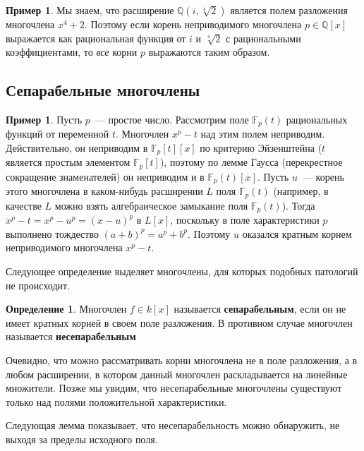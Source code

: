 \documentclass[a4paper,11pt]{scrartcl}
\theoremstyle{plain}
\theoremstyle{definition}
\newtheorem{definition}[theorem]{Определение}
\newtheorem{example}[theorem]{Пример}
\newcommand\dfn[1]{\textbf{#1}}
\newcommand\mb{\mathbb}
\begin{document}
\begin{example}
Мы знаем, что расширение $\mb Q(i,\sqrt[4]{2})$ является полем
разложения многочлена $x^4+2$. Поэтому
если корень неприводимого многочлена $p\in\mb Q[x]$ выражается как
рациональная функция от $i$ и $\sqrt[4]{2}$ с рациональными
коэффициентами, то \emph{все} корни $p$ выражаются таким образом.
\end{example}

\subsection{Сепарабельные многочлены}

\begin{example}
Пусть $p$~--- простое число. Рассмотрим поле $\mb F_p(t)$ рациональных
функций от переменной $t$. Многочлен $x^p-t$ над этим полем
неприводим. Действительно, он неприводим в $\mb F_p[t][x]$ по критерию
Эйзенштейна ($t$ является простым элементом $\mb F_p[t]$), поэтому по
лемме Гаусса (перекрестное сокращение знаменателей) он неприводим и в
$\mb F_p(t)[x]$. Пусть $u$~--- корень этого многочлена в каком-нибудь
расширении $L$ поля $\mb F_p(t)$ (например, в качестве $L$ можно взять
алгебраическое замыкание поля $\mb F_p(t)$). Тогда
$x^p-t=x^p-u^p=(x-u)^p$ в $L[x]$, поскольку в поле характеристики $p$
выполнено тождество $(a+b)^p=a^p+b^p$. Поэтому $u$ оказался кратным
корнем неприводимого многочлена $x^p-t$.
\end{example}

Следующее определение выделяет многочлены, для которых подобных
патологий не происходит.

\begin{definition}
Многочлен $f\in k[x]$ называется \dfn{сепарабельным}, если он не имеет
кратных корней в своем поле разложения. В противном случае многочлен
называется \dfn{несепарабельным}
\end{definition}
Очевидно, что можно рассматривать корни многочлена не в поле
разложения, а в любом расширении, в котором данный многочлен
раскладывается на линейные множители. Позже мы увидим, что
несепарабельные многочлены существуют только над полями положительной
характеристики.

Следующая лемма показывает, что несепарабельность можно обнаружить, не
выходя за пределы исходного поля.
\end{document}
